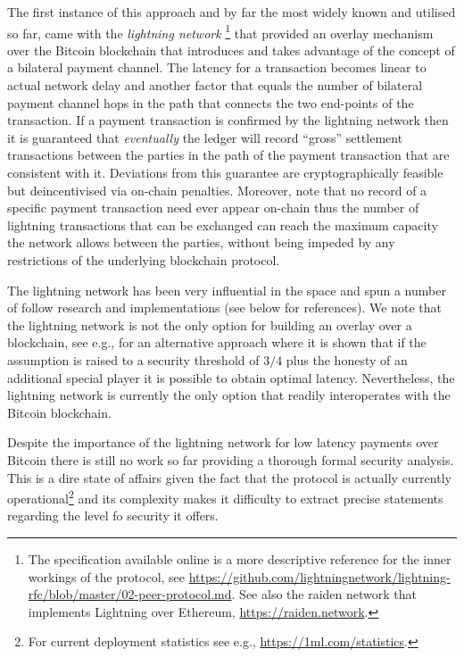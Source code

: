 The first instance of this approach and by far the most widely known and
utilised so far, 
came with the {\em lightning network } 
\cite{lightning}\footnote{The specification available online is a more descriptive reference for the inner workings of the protocol, see \url{https://github.com/lightningnetwork/lightning-rfc/blob/master/02-peer-protocol.md}. See also the raiden network that implements Lightning over Ethereum, \url{https://raiden.network}.} that provided an overlay mechanism over the Bitcoin blockchain that introduces and takes advantage of the concept of a bilateral payment channel. The latency for a transaction becomes linear to actual network delay and another factor that equals the number of bilateral payment channel hops in the path that  connects the two end-points of the transaction. If a payment  transaction is confirmed by the lightning network then  it is guaranteed that {\em eventually} the ledger will record ``gross'' settlement transactions between the parties in the path of the payment transaction that are consistent with it. Deviations from this guarantee are cryptographically feasible but deincentivised via on-chain penalties.   
Moreover, note that no record of a  specific payment transaction need ever appear on-chain 
thus the number of lightning transactions that can be  exchanged can reach the maximum capacity the network allows between the parties, without being impeded by any  restrictions of the underlying blockchain protocol. 

The lightning network has been very influential in the space and spun a number of follow research and implementations (see below for references).
We note that the lightning network is not the only option for building an overlay over a blockchain, see e.g.,  \cite{DBLP:conf/eurocrypt/PassS18} for an alternative approach where it is shown that if the assumption is raised to a security threshold of $3/4$ plus the honesty of an additional special player it is possible to obtain optimal latency. Nevertheless, the lightning network is currently the only option that readily interoperates with the Bitcoin blockchain. 

Despite the importance of the lightning network for low latency payments over Bitcoin there is still no work so far providing a thorough formal security analysis. 
This is a dire state of affairs given the fact that the protocol is actually currently operational\footnote{For current deployment statistics see e.g.,  \url{https://1ml.com/statistics}.}
and its complexity makes it difficulty to extract precise statements regarding the level fo security it offers. 

